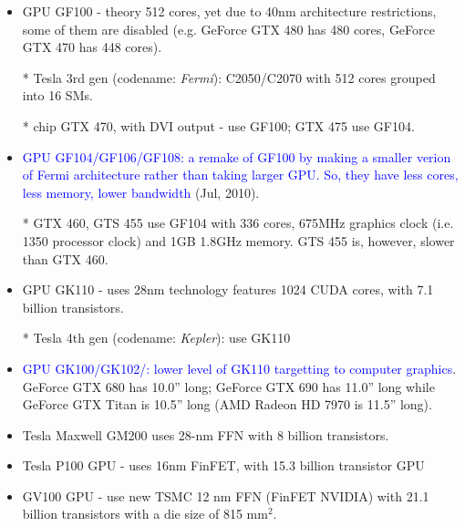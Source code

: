 \begin{itemize}
  \item GPU GF100 - theory 512 cores, yet due to 40nm architecture
    restrictions, some of them are disabled (e.g. GeForce GTX 480 has
    480 cores, GeForce GTX 470 has 448 cores). 
    
  \item [*] Tesla 3rd gen (codename: {\it Fermi}): C2050/C2070 with 512 cores
  grouped into 16 SMs.
  \item [*] chip GTX 470, with DVI output - use GF100; GTX 475 use GF104.
  \item 
    \textcolor{blue}{GPU GF104/GF106/GF108: a remake of
      GF100 by making a smaller verion of Fermi architecture rather than taking
      larger GPU. So, they have less cores, less
      memory, lower bandwidth} (Jul, 2010). 
      
      \item [*] GTX 460, GTS 455 use GF104 with 336 cores, 675MHz graphics clock
      (i.e. 1350 processor clock) and 1GB 1.8GHz memory. GTS 455 is, however,
      slower than GTX 460.

   \item GPU GK110 - uses 28nm technology features 1024 CUDA cores, with 7.1 billion transistors.
   
    
   \item [*] Tesla 4th gen (codename: {\it Kepler}): use GK110 
   
   \item \textcolor{blue}{GPU GK100/GK102/: lower level of GK110 targetting to
   computer graphics}. GeForce GTX 680 has 10.0'' long; GeForce GTX 690 has
   11.0'' long while GeForce GTX Titan is 10.5'' long (AMD Radeon HD 7970 is
   11.5'' long).
   
   \item Tesla Maxwell GM200 uses 28-nm FFN with 8 billion transistors.
   
   \item Tesla P100 GPU - uses 16nm FinFET, with 15.3 billion transistor GPU
   
   \item  GV100 GPU - use new TSMC 12 nm FFN (FinFET NVIDIA) with 21.1 billion transistors with a die size of 815 mm$^2$.
  
  
  \end{itemize}


